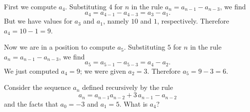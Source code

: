 \documentclass{ximera}
\begin{document}
\begin{explanation}
  First we compute $a_4$.  Substituting $4$ for $n$ in the rule $a_n = a_{n-1} - a_{n-3}$, we find
$$
a_4 = a_{4-1} - a_{4-3} = a_3 - a_1.
$$
But we have values for $a_3$ and $a_1$, namely $10$ and $1$, respectively.  Therefore $a_4 = 10 - 1 = 9$.

Now we are in a position to compute $a_5$.  Substituting $5$ for $n$ in the rule $a_n = a_{n-1} - a_{n-3}$, we find
$$
a_5 = a_{5-1} - a_{5-3} = a_4 - a_2.
$$
We just computed $a_4 = 9$; we were given $a_2 = 3$.  Therefore $a_5 = 9 - 3 = 6$.
\end{explanation}


\begin{question}
  Consider the sequence $a_{n}$ defined recursively by the
  rule \[a_n = {a_{n-1}} {a_{n-2}} + 3 \, {a_{n-1}} - {a_{n-2}}\] and
  the facts that $a_0 = -3$ and $a_1 = 5$.  What is $a_4$?


\end{question}
\end{document}
